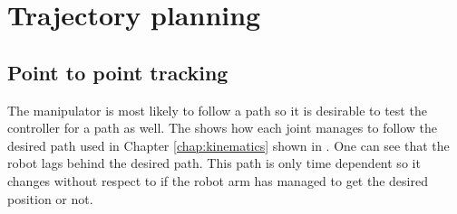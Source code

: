 \section{Trajectory planning}
\subsection{Point to point tracking}
The manipulator is most likely to follow a path so it is desirable to test the controller for a path as well. The  shows how each joint manages to follow the desired path used in Chapter \ref{chap:kinematics} shown in  . One can see that the robot lags behind the desired path. This path is only time dependent so it changes without respect to if the robot arm has managed to get the desired position or not.\\\\
\def\picsSiz{1.08}
